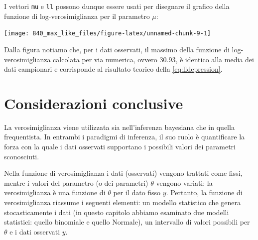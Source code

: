 \documentclass[
  10pt,
  italian,
  a4paper,
  extrafontsizes,onecolumn,openright
  ]{memoir}
\newenvironment{Shaded}{\begin{snugshade}}{\end{snugshade}}
\newcommand{\AttributeTok}[1]{\textcolor[rgb]{0.77,0.63,0.00}{#1}}
\newcommand{\FunctionTok}[1]{\textcolor[rgb]{0.00,0.00,0.00}{#1}}
\newcommand{\NormalTok}[1]{#1}
\newcommand{\SpecialCharTok}[1]{\textcolor[rgb]{0.00,0.00,0.00}{#1}}
\newcommand{\StringTok}[1]{\textcolor[rgb]{0.31,0.60,0.02}{#1}}
\theoremstyle{definition}
\theoremstyle{definition}
\theoremstyle{definition}
\theoremstyle{definition}
\theoremstyle{remark}
\begin{document}
I vettori \texttt{mu} e \texttt{ll} possono dunque essere usati per disegnare il grafico della funzione di log-verosimiglianza per il parametro \(\mu\):

\begin{Shaded}
\end{Shaded}

\begin{center}\texttt{[image: 840\_max\_like\_files/figure-latex/unnamed-chunk-9-1]} \end{center}

Dalla figura notiamo che, per i dati osservati, il massimo della funzione di log-verosimiglianza calcolata per via numerica, ovvero 30.93, è identico alla media dei dati campionari e corrisponde al risultato teorico della \eqref{eq:lldepression}.

\hypertarget{considerazioni-conclusive-1}{%
\section*{Considerazioni conclusive}\label{considerazioni-conclusive-1}}

La verosimiglianza viene utilizzata sia nell'inferenza bayesiana che in quella frequentista. In entrambi i paradigmi di inferenza, il suo ruolo è quantificare la forza con la quale i dati osservati supportano i possibili valori dei parametri sconosciuti.

Nella funzione di verosimiglianza i dati (osservati) vengono trattati come fissi, mentre i valori del parametro (o dei parametri) \(\theta\) vengono variati: la verosimiglianza è una funzione di \(\theta\) per il dato fisso \(y\). Pertanto, la funzione di verosimiglianza riassume i seguenti elementi: un modello statistico che genera stocasticamente i dati (in questo capitolo abbiamo esaminato due modelli statistici: quello binomiale e quello Normale), un intervallo di valori possibili per \(\theta\) e i dati osservati \(y\).
\end{document}
